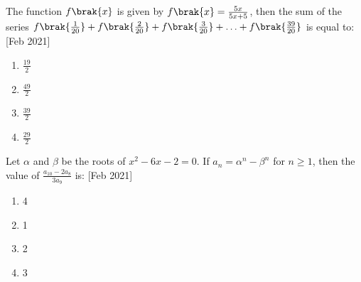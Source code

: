     \item{
	
			The function \( f\brak{x} \) is given by \( f\brak{x} = \frac{5x}{5x+5} \), then the sum of the series \( f\brak{\frac{1}{20}} + f\brak{\frac{2}{20}} + f\brak{\frac{3}{20}} + \ldots + f\brak{\frac{39}{20}} \) is equal to:
			\text{   }\hfill
			{[Feb 2021]}
			\begin{multicols}{4}
				\begin{enumerate}
					\item $\frac{19}{2}$
					\item $\frac{49}{2}$
					\item $\frac{39}{2}$
					\item $\frac{29}{2}$
				\end{enumerate}
			\end{multicols}
			
		}
    \item{
        
            Let $\alpha$ and $\beta$ be the roots of $x^2 - 6x - 2 = 0$. If $a_n = \alpha^n - \beta^n$ for $n \geq 1$, then the value of $\frac{a_{10} - 2a_8}{3a_9}$ is:
             \hfill
              {[Feb 2021]}
              \begin{multicols}{4}
	              	\begin{enumerate}
	              		\item 4
	              		\item 1
	              		\item 2
	              		\item 3
	              	\end{enumerate}
              \end{multicols}
        
        }


